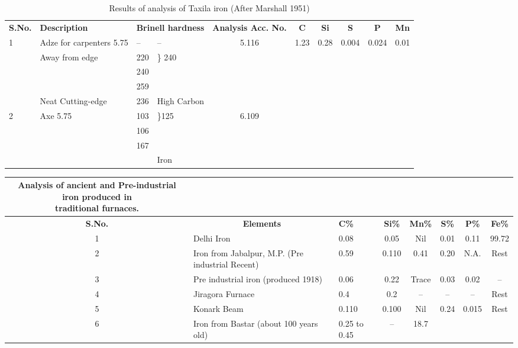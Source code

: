 {\setlength\tabcolsep{2pt}
{\fontsize{8}{10}\selectfont
\begin{longtable}{|l|p{2.5cm}|p{.5cm}|p{.5cm}|c|c|c|c|c|c|}
\captionsetup{font=small}
\caption{Results of analysis of Taxila iron (After Marshall 1951)}\label{table 8.1}\\
\hline
\textbf{S.No.} & \textbf{Description} & \multicolumn{2}{m{1.3cm}|}{\centering \textbf{Brinell  hardness}} & \multicolumn{1}{m{1.3cm}|}{\centering \textbf{Analysis Acc. No.}} & \textbf{C} & \textbf{Si} & \textbf{S} & \textbf{P} & \textbf{Mn}\\
\hline
1 & Adze for carpenters 5.75 & -- & -- & 5.116 & 1.23 & 0.28 & 0.004 & 0.024 & 0.01\\
  & Away from edge & 220  &\multirow{2}{1cm}{\} 240}&&&&&&\\
  &  & 240 &&&&&&&\\
  & & 259 &&&&&&&\\
  & Neat Cutting-edge & 236 & High Carbon &&&&&&\\
  \hline
  2 & Axe 5.75 & 103 & \multirow{3}{1cm}{\}125}& 6.109 &&&&&\\
  & & 106 &&&&&&&\\
  & & 167 &&&&&&&\\
  & & & Iron &&&&&&\\
  \hline
\end{longtable}
}}

{\setlength\tabcolsep{2pt}
{\fontsize{8}{10}\selectfont\begin{longtable}{|c|p{3cm}|p{1cm}|c|c|c|c|c|}
\captionsetup{font=small}
\caption{Analysis of ancient and Pre-industrial iron produced in\\ traditional furnaces.}\label{table 8.2}\\
\hline
\textbf{S.No.} & \multicolumn{1}{c|}{\textbf{Elements}} & \textbf{C\%} & \textbf{Si\%} & \textbf{Mn\%} & \textbf{S\%} & \textbf{P\%} & \textbf{Fe\%} \\
\hline
1 & Delhi Iron & 0.08 & 0.05 & Nil & 0.01 & 0.11 & 99.72\\
2 & Iron from Jabalpur, M.P. (Pre industrial Recent) & 0.59 & 0.110 & 0.41 & 0.20 & N.A. & Rest\\
3 & Pre industrial iron (produced 1918) & 0.06 & 0.22 & Trace & 0.03 & 0.02 & --\\
4 & Jiragora Furnace & 0.4 & 0.2 & -- & -- & -- & Rest\\
5 & Konark Beam & 0.110 & 0.100 & Nil & 0.24 & 0.015 & Rest\\
6 & Iron from Bastar (about 100 years old) & 0.25 to 0.45 & -- & 18.7 & & & \\
\hline
\end{longtable}
}}

